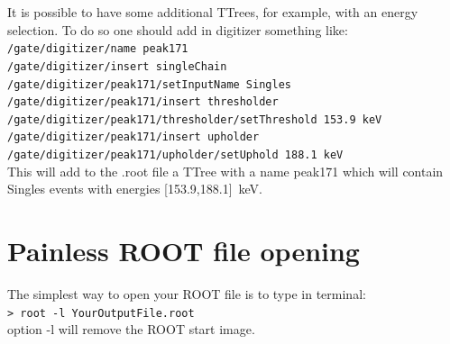 \documentclass[12pt]{article}
\begin{document}
It is possible to have some additional TTrees, for example, with an energy selection. To do so one should add in digitizer something like: \\
\verb|/gate/digitizer/name peak171| \\
\verb|/gate/digitizer/insert singleChain| \\
\verb|/gate/digitizer/peak171/setInputName Singles| \\
\verb|/gate/digitizer/peak171/insert thresholder| \\
\verb|/gate/digitizer/peak171/thresholder/setThreshold 153.9 keV| \\
\verb|/gate/digitizer/peak171/insert upholder| \\
\verb|/gate/digitizer/peak171/upholder/setUphold 188.1 keV| \\
This will add to the .root file a TTree with a name peak171 which will contain Singles events with energies [153.9,188.1]~keV.
 

\section{Painless ROOT file opening}
The simplest way to open your ROOT file is to type in terminal:\\
\verb|> root -l YourOutputFile.root |\\
option -l will remove the ROOT start image. 
\end{document}
